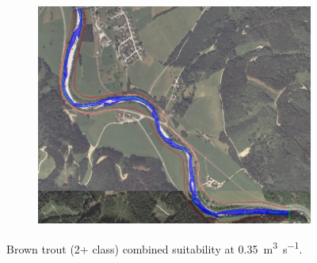\begin{figure}[!htb]
\begin{subfigure}{.3\textwidth}
	\end{subfigure}%
	\begin{subfigure}{.7\textwidth}
		\centering
		\includegraphics[width=\linewidth]{images/2_0035}
	\end{subfigure}
	\caption{Brown trout (2+ class) combined suitability at \SI[per-mode=symbol]{0.35}{\cubic\meter\per\second}.}
	\label{fig:2_0035}
\end{figure}


